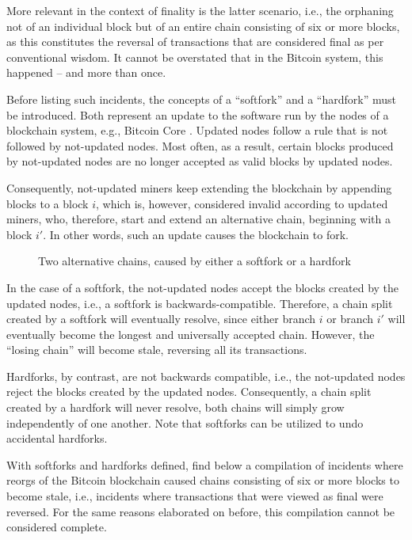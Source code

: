 More relevant in the context of finality is the latter scenario, i.e., the orphaning not of an individual block but of an entire chain consisting of six or more blocks, as this constitutes the reversal of transactions that are considered final as per conventional wisdom.
It cannot be overstated that in the Bitcoin system, this happened -- and more than once.

Before listing such incidents, the concepts of a ``softfork'' \autocite{bitcoinwiki2018softfork} and a ``hardfork'' \autocite{bitcoinwiki2019hardfork} must be introduced.
Both represent an update to the software run by the nodes of a blockchain system, e.g., Bitcoin Core \autocite{github2021bitcoin}.
Updated nodes follow a rule that is not followed by not-updated nodes.
Most often, as a result, certain blocks produced by not-updated nodes are no longer accepted as valid blocks by updated nodes.

Consequently, not-updated miners keep extending the blockchain by appending blocks to a block $i$, which is, however, considered invalid according to updated miners, who, therefore, start and extend an alternative chain, beginning with a block $i'$.
In other words, such an update causes the blockchain to fork.
\\
\begin{figure}[H]
	\centering
	
	\caption*{Two alternative chains, caused by either a softfork or a hardfork}
\end{figure}

In the case of a softfork, the not-updated nodes accept the blocks created by the updated nodes, i.e., a softfork is backwards-compatible.
Therefore, a chain split created by a softfork will eventually resolve, since either branch $i$ or branch $i'$ will eventually become the longest and universally accepted chain.
However, the ``losing chain'' will become stale, reversing all its transactions.

Hardforks, by contrast, are not backwards compatible, i.e., the not-updated nodes reject the blocks created by the updated nodes.
Consequently, a chain split created by a hardfork will never resolve, both chains will simply grow independently of one another.
Note that softforks can be utilized to undo accidental hardforks.

With softforks and hardforks defined, find below a compilation of incidents where reorgs of the Bitcoin blockchain caused chains consisting of six or more blocks to become stale, i.e., incidents where transactions that were viewed as final were reversed.
For the same reasons elaborated on before, this compilation cannot be considered complete.

